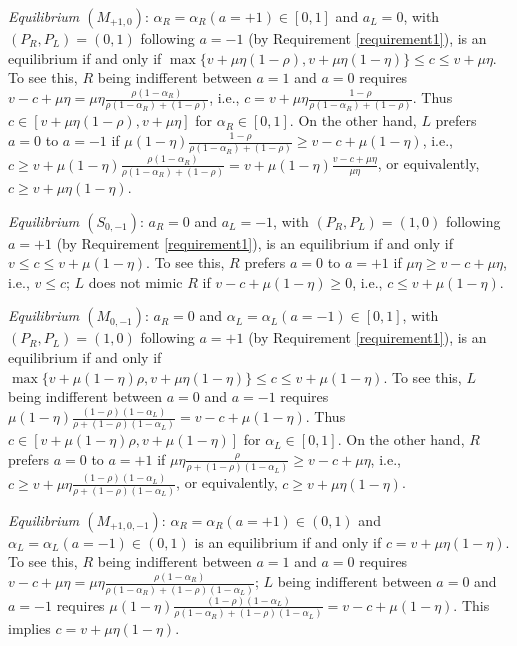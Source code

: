 \documentclass[english,12pt]{article}
\theoremstyle{plain}
\theoremstyle{plain}
\theoremstyle{definition}
\theoremstyle{definition}
\theoremstyle{assumption}
\theoremstyle{plain}
\theoremstyle{plain}
\theoremstyle{plain}
\theoremstyle{plain}
\theoremstyle{definition}%
\theoremstyle{plain}
\theoremstyle{plain}
\theoremstyle{plain}
\theoremstyle{plain}
\theoremstyle{plain}
\theoremstyle{plain}
\begin{document}
\textit{Equilibrium $(M_{+1,0})$}: $\alpha_R = \alpha_R(a=+1)\in [0,1]$ and $a_L=0$, with $(P_R,P_L)=(0,1)$ following $a=-1$ (by Requirement \ref{requirement1}), is an equilibrium if and only if $\max\{v+\mu\eta(1-\rho),v+\mu\eta(1-\eta)\}\leq c\leq v+\mu\eta$. To see this, $R$ being indifferent between $a=1$ and $a=0$ requires $v-c+\mu\eta = \mu\eta\frac{\rho (1-\alpha_R)}{\rho(1-\alpha_R)+(1-\rho)}$, i.e., $c = v+\mu\eta\frac{1-\rho}{\rho(1-\alpha_R)+(1-\rho)}$. Thus $c\in [v+\mu\eta(1-\rho), v+\mu\eta]$ for $\alpha_R\in[0,1]$. On the other hand, $L$ prefers $a=0$ to $a=-1$ if $\mu(1-\eta)\frac{1-\rho}{\rho(1-\alpha_R) + (1-\rho)}\geq v-c+\mu(1-\eta)$, i.e., $c\geq v+\mu(1-\eta)\frac{\rho (1-\alpha_R)}{\rho(1-\alpha_R)+(1-\rho)} = v+\mu(1-\eta)\frac{v-c+\mu\eta}{\mu\eta}$, or equivalently, $c\geq v+\mu\eta(1-\eta)$.

\textit{Equilibrium $(S_{0,-1})$}: $a_R=0$ and $a_L=-1$, with $(P_R,P_L)=(1,0)$ following $a=+1$ (by Requirement \ref{requirement1}), is an equilibrium if and only if $v\leq c\leq v+\mu(1-\eta)$. To see this, $R$ prefers $a=0$ to $a=+1$ if $\mu\eta\geq v-c+\mu\eta$, i.e., $v\leq c$; $L$ does not mimic $R$ if $v-c+\mu(1-\eta)\geq 0$, i.e., $c\leq v+\mu(1-\eta)$. 

\textit{Equilibrium $(M_{0,-1})$}: $a_R=0$ and $\alpha_L=\alpha_L(a=-1)\in[0,1]$, with $(P_R,P_L)=(1,0)$ following $a=+1$ (by Requirement \ref{requirement1}), is an equilibrium if and only if $\max\{v+\mu(1-\eta)\rho,v+\mu\eta(1-\eta)\}\leq c\leq v+\mu(1-\eta)$. To see this, $L$ being indifferent between $a=0$ and $a=-1$ requires $\mu(1-\eta)\frac{(1-\rho)(1-\alpha_L)}{\rho+(1-\rho)(1-\alpha_L)} = v-c+\mu(1-\eta)$. Thus $c\in [v+\mu(1-\eta)\rho, v+\mu(1-\eta)]$ for $\alpha_L\in[0,1]$. On the other hand, $R$ prefers $a=0$ to $a=+1$ if $\mu\eta\frac{\rho}{\rho+(1-\rho)(1-\alpha_L)}\geq v-c+\mu\eta$, i.e., $c\geq v+\mu\eta\frac{(1-\rho)(1-\alpha_L)}{\rho+(1-\rho)(1-\alpha_L)}$, or equivalently, $c\geq v+\mu\eta(1-\eta)$.

\textit{Equilibrium $(M_{+1,0,-1})$}: $\alpha_R=\alpha_R(a=+1)\in(0,1)$ and $\alpha_L=\alpha_L(a=-1)\in(0,1)$ is an equilibrium if and only if $c=v+\mu\eta(1-\eta)$. To see this, $R$ being indifferent between $a=1$ and $a=0$ requires $v-c+\mu\eta = \mu\eta\frac{\rho (1-\alpha_R)}{\rho(1-\alpha_R)+(1-\rho)(1-\alpha_L)}$; $L$ being indifferent between $a=0$ and $a=-1$ requires $\mu(1-\eta)\frac{(1-\rho)(1-\alpha_L)}{\rho(1-\alpha_R)+(1-\rho)(1-\alpha_L)} = v-c+\mu(1-\eta)$. This implies $c = v+\mu\eta(1-\eta)$.
\end{document}
